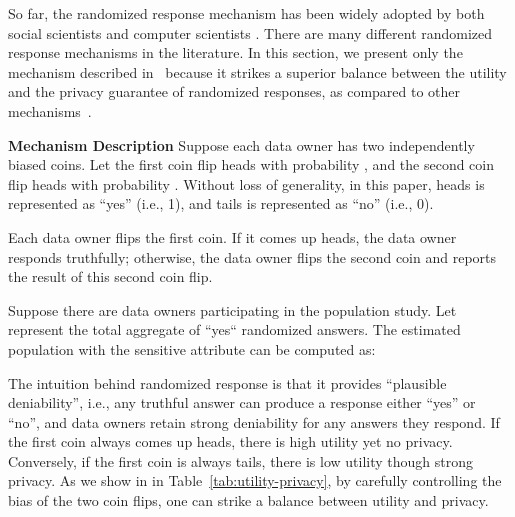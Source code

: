 \documentclass[conference]{IEEEtran}
\begin{document}
So far, the randomized response mechanism has been widely adopted by both social scientists and computer scientists \cite{warner1965randomized,DBLP:conf/ccs/ErlingssonPK14}. There are many different randomized response mechanisms in the literature.  In this section, we present only the mechanism described in~\cite{fox1986randomized} because it strikes a superior balance between the utility and the privacy guarantee of randomized responses, as compared to other mechanisms~\cite{warner1965randomized,kuk1990asking,greenberg1969unrelated,greenberg1971application}.


\textbf{Mechanism Description} Suppose each data owner has two independently biased coins. Let the first coin flip heads with probability , and the second coin flip heads with probability .  Without loss of generality, in this paper, heads is represented as ``yes'' (i.e., 1), and tails is represented as ``no'' (i.e., 0).


Each data owner flips the first coin. If it comes up heads, the data owner responds truthfully; otherwise, the data owner flips the second coin and reports the result of this second coin flip.

Suppose there are  data owners participating in the population study. Let  represent the total aggregate of ``yes`` randomized answers. The estimated population with the sensitive attribute  can be computed as:



The intuition behind randomized response is that it provides ``plausible deniability'', i.e., any truthful answer can produce a response either ``yes'' or ``no'', and data owners retain strong deniability for any answers they respond. If the first coin always comes up heads, there is high utility yet no privacy. Conversely, if the first coin is always tails, there is low utility though strong privacy. As we show in in Table~\ref{tab:utility-privacy}, by carefully controlling the bias of the two coin flips, one can strike a balance between utility and privacy.
\end{document}
